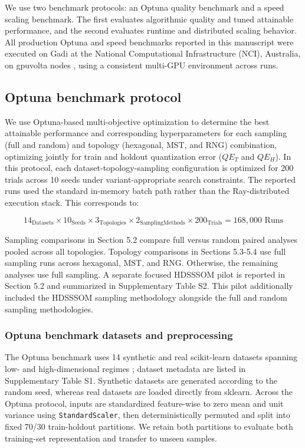 \documentclass[11pt]{article}
\begin{document}
We use two benchmark protocols: an Optuna quality benchmark and a speed scaling benchmark. The first evaluates algorithmic quality and tuned attainable performance, and the second evaluates runtime and distributed scaling behavior. All production Optuna and speed benchmarks reported in this manuscript were executed on Gadi at the National Computational Infrastructure (NCI), Australia, on gpuvolta nodes \citep{HPCSystemsNCI}, using a consistent multi-GPU environment across runs.

\subsection{Optuna benchmark protocol}

We use Optuna-based multi-objective optimization to determine the best attainable performance and corresponding hyperparameters for each sampling (full and random) and topology (hexagonal, MST, and RNG) combination, optimizing jointly for train and holdout quantization error ($QE_T$ and $QE_H$). In this protocol, each dataset-topology-sampling configuration is optimized for 200 trials across 10 seeds under variant-appropriate search constraints. The reported runs used the standard in-memory batch path rather than the Ray-distributed execution stack. This corresponds to:

\[
14_{\text{Datasets}} \times 10_{\text{Seeds}} \times 3_{\text{Topologies}} \times 2_{\text{SamplingMethods}} \times 200_{\text{Trials}}= 168{,}000 \text{ Runs}
\]

Sampling comparisons in Section 5.2 compare full versus random paired analyses pooled across all topologies. Topology comparisons in Sections 5.3-5.4 use full sampling runs across hexagonal, MST, and RNG. Otherwise, the remaining analyses use full sampling. A separate focused HDSSSOM pilot is reported in Section 5.2 and summarized in Supplementary Table S2. This pilot additionally included the HDSSSOM sampling methodology alongside the full and random sampling methodologies.

\subsubsection{Optuna benchmark datasets and preprocessing}

The Optuna benchmark uses 14 synthetic and real scikit-learn datasets spanning low- and high-dimensional regimes \citep{pedregosaScikitlearnMachineLearning2011}; dataset metadata are listed in Supplementary Table S1. Synthetic datasets are generated according to the random seed, whereas real datasets are loaded directly from sklearn. Across the Optuna protocol, inputs are standardized feature-wise to zero mean and unit variance using \texttt{StandardScaler}, then deterministically permuted and split into fixed 70/30 train-holdout partitions. We retain both partitions to evaluate both training-set representation and transfer to unseen samples.
\end{document}
